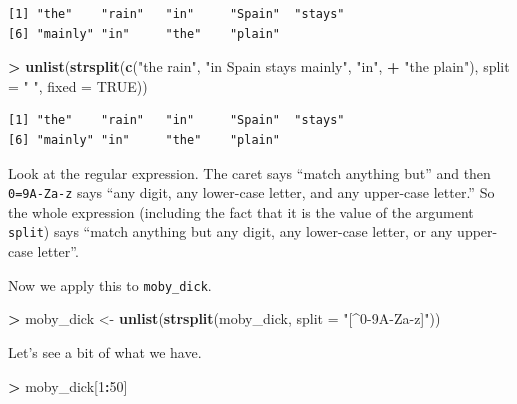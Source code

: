 \documentclass[]{krantz}
\makeatletter
\newenvironment{Shaded}{\begin{snugshade}}{\end{snugshade}}
\newcommand{\DataTypeTok}[1]{\textcolor[rgb]{0.27,0.27,0.27}{#1}}
\newcommand{\DecValTok}[1]{\textcolor[rgb]{0.06,0.06,0.06}{#1}}
\newcommand{\KeywordTok}[1]{\textcolor[rgb]{0.27,0.27,0.27}{\textbf{#1}}}
\newcommand{\NormalTok}[1]{#1}
\newcommand{\OperatorTok}[1]{\textcolor[rgb]{0.43,0.43,0.43}{\textbf{#1}}}
\newcommand{\OtherTok}[1]{\textcolor[rgb]{0.37,0.37,0.37}{#1}}
\newcommand{\StringTok}[1]{\textcolor[rgb]{0.5,0.5,0.5}{#1}}
\newenvironment{kframe}{%
\medskip{}
\setlength{\fboxsep}{.8em}
 \def\at@end@of@kframe{}%
 \ifinner\ifhmode%
  \def\at@end@of@kframe{\end{minipage}}%
  \begin{minipage}{\columnwidth}%
 \fi\fi%
 \def\FrameCommand##1{\hskip\@totalleftmargin \hskip-\fboxsep
 \colorbox{shadecolor}{##1}\hskip-\fboxsep
     \hskip-\linewidth \hskip-\@totalleftmargin \hskip\columnwidth}%
 \MakeFramed {\advance\hsize-\width
   \@totalleftmargin\z@ \linewidth\hsize
   \@setminipage}}%
 {\par\unskip\endMakeFramed%
 \at@end@of@kframe}
\renewenvironment{Shaded}{\begin{kframe}}{\end{kframe}}
\makeatother
\begin{document}
\begin{verbatim}
[1] "the"    "rain"   "in"     "Spain"  "stays" 
[6] "mainly" "in"     "the"    "plain" 
\end{verbatim}

\begin{Shaded}
\begin{Highlighting}[]
\OperatorTok{>}\StringTok{ }\KeywordTok{unlist}\NormalTok{(}\KeywordTok{strsplit}\NormalTok{(}\KeywordTok{c}\NormalTok{(}\StringTok{"the rain"}\NormalTok{, }\StringTok{"in Spain stays mainly"}\NormalTok{, }\StringTok{"in"}\NormalTok{, }
\OperatorTok{+}\StringTok{   "the plain"}\NormalTok{), }\DataTypeTok{split =} \StringTok{" "}\NormalTok{, }\DataTypeTok{fixed =} \OtherTok{TRUE}\NormalTok{))}
\end{Highlighting}
\end{Shaded}

\begin{verbatim}
[1] "the"    "rain"   "in"     "Spain"  "stays" 
[6] "mainly" "in"     "the"    "plain" 
\end{verbatim}

Look at the regular expression. The caret says ``match anything but'' and then \texttt{0=9A-Za-z} says ``any digit, any lower-case letter, and any upper-case letter.'' So the whole expression (including the fact that it is the value of the argument \texttt{split}) says ``match anything but any digit, any lower-case letter, or any upper-case letter''.

Now we apply this to \texttt{moby\_dick}.

\begin{Shaded}
\begin{Highlighting}[]
\OperatorTok{>}\StringTok{ }\NormalTok{moby_dick <-}\StringTok{ }\KeywordTok{unlist}\NormalTok{(}\KeywordTok{strsplit}\NormalTok{(moby_dick, }\DataTypeTok{split =} \StringTok{"[^0-9A-Za-z]"}\NormalTok{))}
\end{Highlighting}
\end{Shaded}

Let's see a bit of what we have.

\begin{Shaded}
\begin{Highlighting}[]
\OperatorTok{>}\StringTok{ }\NormalTok{moby_dick[}\DecValTok{1}\OperatorTok{:}\DecValTok{50}\NormalTok{]}
\end{Highlighting}
\end{Shaded}
\end{document}

